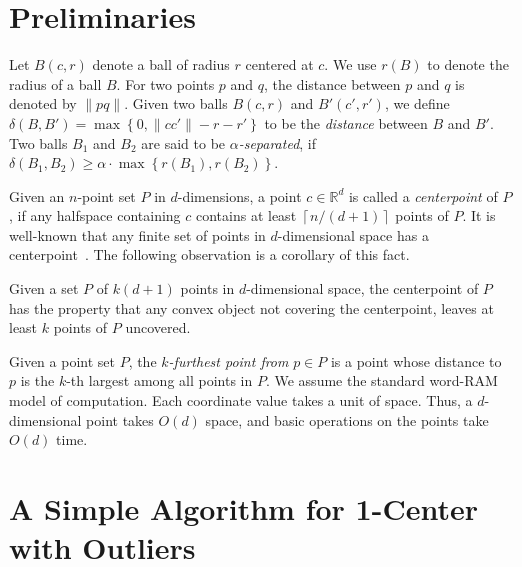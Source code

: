 \documentclass[envcountsame]{cls/cccg15}
\renewcommand{\O}{\ensuremath{{O}}}
\newcommand{\IR}{\ensuremath{\mathbb{R}}}
\newcommand{\set}[1]{\left\{ #1 \right\}}
\newcommand{\ceil}[1]{\left\lceil{#1}\right\rceil}
\newcommand{\floor}[1]{\left\lfloor{#1}\right\rfloor}
\newcommand{\len}[1]{\|{#1}\|}
\newcommand{\gee}{\geqslant}
\renewcommand{\geq}{\gee}
\begin{document}
\section{Preliminaries}
\label{sec:pre}
Let $B(c,r)$ denote a ball of radius $r$ centered at $c$. 
We use $r(B)$ to denote the radius of a ball $B$. %
For two points $p$ and $q$, %
the distance between $p$ and $q$ is denoted by $\len{pq}$.
Given two balls $B(c,r)$ and $B'(c',r')$, 
we define 
$\delta(B, B') = \max \set{0, \len{cc'}-r-r'}$
to be the \emph{distance} between $B$ and $B'$.
Two balls $B_1$ and $B_2$ %
are said to be \emph{$\alpha$-separated}, 
if $\delta(B_1, B_2) \geq \alpha \cdot \max \set{r(B_1), r(B_2)}$.


Given an $n$-point set $P$ in $d$-dimensions,
a point $c \in \IR^d$ is called a \emph{centerpoint} of $P$,
if any halfspace containing $c$ contains at least $\ceil{{n}/({d + 1})}$ points of $P$. 
It is well-known that any finite set of points in $d$-dimensional space 
has a centerpoint~\cite{danzer1963helly}. 
The following observation is a corollary of this fact.

\begin{obs}
\label{obs:omitting-centerpoint}
	Given a set $P$ of $k(d+1)$ points in $d$-dimensional space, 
	the centerpoint of $P$ has the property that 
	any convex object not covering the centerpoint, 
	leaves at least $k$ points of $P$ uncovered.
\end{obs}

Given  a point set $P$,
the \emph{$k$-furthest point from} $p \in P$
is a point whose distance to $p$ is the $k$-th largest among all points in $P$.
We assume the standard word-RAM model of computation. 
Each coordinate value takes a unit of space.
Thus, a $d$-dimensional point takes $\O(d)$ space,
and basic operations on the points take $\O(d)$ time.



\section{A Simple Algorithm for 1-Center with Outliers}
\label{sec:1-center}
\end{document}
